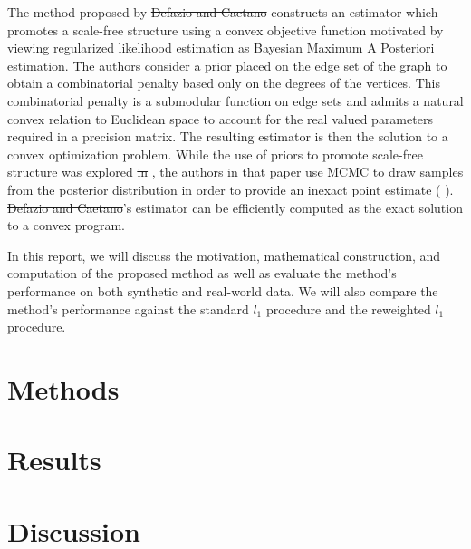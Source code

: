 \documentclass{uwstat572}
\newcommand{\vmdel}[1]{\sout{#1}}
\newcommand{\vmadd}[1]{\textbf{\color{red}{#1}}}
\newcommand{\vmcomment}[1]{({\color{blue}{VM's comment:}} \textbf{\color{blue}{#1}})}
\begin{document}
The method proposed by \vmadd{\citet{Defazio2012}} \vmdel{Defazio and Caetano} constructs an estimator which promotes a scale-free structure using a convex objective function motivated by viewing regularized likelihood estimation as Bayesian Maximum A Posteriori estimation.  The authors consider a prior placed on the edge set of the graph to obtain a combinatorial penalty based only on the degrees of the vertices. This combinatorial penalty is a submodular function on edge sets and admits a natural convex relation to Euclidean space to account for the real valued parameters required in a precision matrix. The resulting estimator is then the solution to a convex optimization problem. 
While the use of priors to promote scale-free structure was explored \vmdel{in} \vmadd{by} \cite{sheridan2010}, the authors in that paper use MCMC to draw samples from the posterior distribution \vmadd{model parameters} in order to provide an inexact point estimate \vmcomment{presumably, the have the full posterior, not just a point estimate, no?}.  \vmadd{\citet{Defazio2012}} \vmdel{Defazio and Caetano}'s estimator can be efficiently computed as the exact solution to a convex program.

In this report, we will discuss the motivation, mathematical construction, and computation of the proposed method as well as evaluate the method's performance on both synthetic and real-world data.  We will also compare the method's performance against the standard $l_1$ procedure and the reweighted $l_1$ procedure.  

\section{Methods}

\section{Results}

\section{Discussion}


\end{document}
